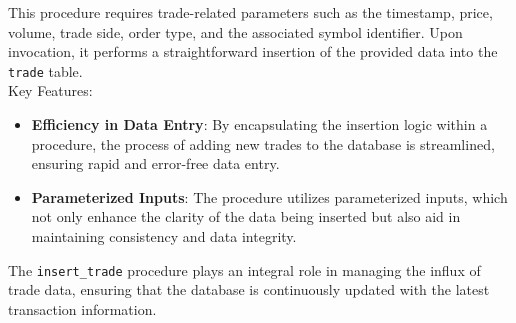 This procedure requires trade-related parameters such as the timestamp, price, volume, trade side, order type, and the associated symbol identifier. Upon invocation, it performs a straightforward insertion of the provided data into the \texttt{trade} table. \\

Key Features:
\begin{itemize}
    \item \textbf{Efficiency in Data Entry}: By encapsulating the insertion logic within a procedure, the process of adding new trades to the database is streamlined, ensuring rapid and error-free data entry.
    \item \textbf{Parameterized Inputs}: The procedure utilizes parameterized inputs, which not only enhance the clarity of the data being inserted but also aid in maintaining consistency and data integrity.
\end{itemize}

The \texttt{insert\_trade} procedure plays an integral role in managing the influx of trade data, ensuring that the database is continuously updated with the latest transaction information.

